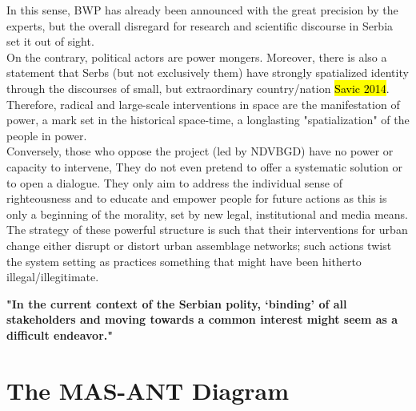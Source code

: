 \documentclass[11pt]{report}
\begin{document}
In this sense, BWP has already been announced with the great precision by the experts, but the overall disregard for research and scientific discourse in Serbia set it out of sight.
\\
On the contrary, political actors are power mongers.
Moreover, there is also a statement that Serbs (but not exclusively them) have strongly spatialized identity through the discourses of small, but extraordinary country/nation \hl{Savic 2014}.
Therefore, radical and large-scale interventions in space are the manifestation of power, a mark set in the historical space-time, a longlasting "spatialization" of the people in power.
\\
Conversely, those who oppose the project (led by NDVBGD) have no power or capacity to intervene, They do not even pretend to offer a systematic solution or to open a dialogue. They only aim to address the individual sense of righteousness and to educate and empower people for future actions as this is only a beginning of the morality, set by new legal, institutional and media means.
The strategy of these powerful structure is such that their interventions for urban change either disrupt or distort urban assemblage networks; such actions twist the system setting as practices something that might have been hitherto illegal/illegitimate.

\textbf{"In the current context  of  the  Serbian  polity,  ‘binding’  of  all stakeholders  and  moving  towards  a  common interest  might  seem  as  a  difficult  endeavor." \cite{Volic et al, 2012}}



\section{The MAS-ANT Diagram}
\end{document}

